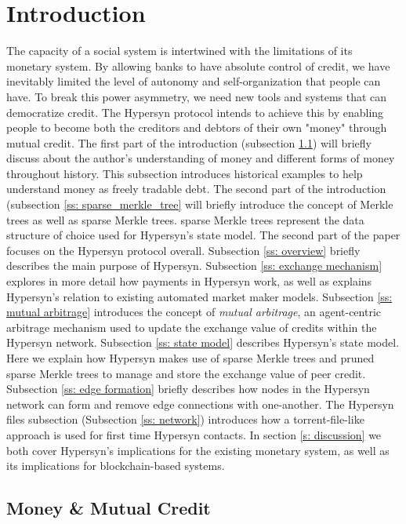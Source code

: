 \documentclass{article}
\begin{document}
\section{Introduction}
The capacity of a social system is intertwined with the limitations of its monetary system. By allowing banks to have absolute control of credit, we have inevitably limited the level of autonomy and self-organization that people can have. To break this power asymmetry, we need new tools and systems that can democratize credit. The Hypersyn protocol intends to achieve this by enabling people to become both the creditors and debtors of their own "money" through mutual credit. The first part of the introduction (subsection \ref{ss:self_issued_credit}) will briefly discuss about the author's understanding of money and different forms of money throughout history. This subsection introduces historical examples to help understand money as freely tradable debt. The second part of the introduction (subsection \ref{ss: sparse_merkle_tree} will briefly introduce the concept of Merkle trees as well as sparse Merkle trees. sparse Merkle trees represent the data structure of choice used for Hypersyn's state model. The second part of the paper focuses on the Hypersyn protocol overall. Subsection \ref{ss: overview} briefly describes the main purpose of Hypersyn. Subsection \ref{ss: exchange mechanism} explores in more detail how payments in Hypersyn work, as well as explains Hypersyn's relation to existing automated market maker models. Subsection \ref{ss: mutual arbitrage} introduces the concept of \textit{mutual arbitrage}, an agent-centric arbitrage mechanism used to update the exchange value of credits within the Hypersyn network. Subsection \ref{ss: state model} describes Hypersyn's state model. Here we explain how Hypersyn makes use of sparse Merkle trees and pruned sparse Merkle trees to manage and store the exchange value of peer credit. Subsection \ref{ss: edge formation} briefly describes how nodes in the Hypersyn network can form and remove edge connections with one-another. The Hypersyn files subsection (Subsection \ref{ss: network}) introduces how a torrent-file-like approach is used for first time Hypersyn contacts. In section \ref{s: discussion} we both cover Hypersyn's implications for the existing monetary system, as well as its implications for blockchain-based systems.

\subsection{Money \& Mutual Credit}
\label{ss:self_issued_credit}
\end{document}
